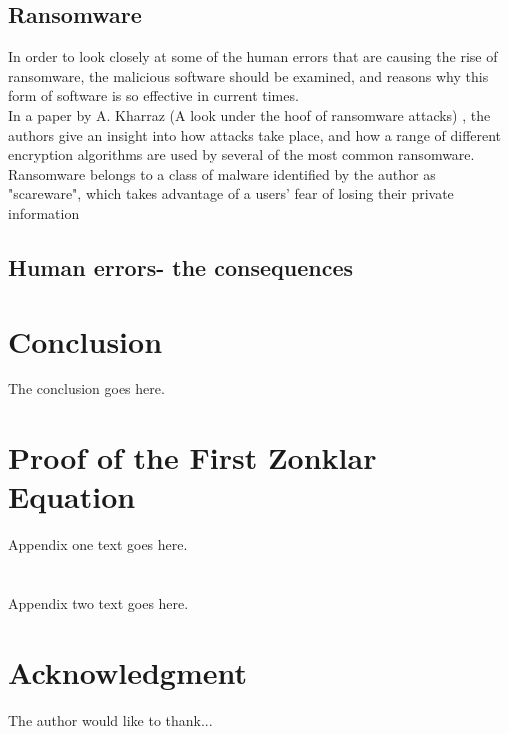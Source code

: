\documentclass[journal,comsoc]{IEEEtran}
\begin{document}
\subsection{Ransomware}
In order to look closely at some of the human errors that are causing the rise of ransomware, the malicious software should be examined, and reasons why this form of software is so effective in current times. \\
In a paper by A. Kharraz (A look under the hoof of ransomware attacks) \cite{under-the-hood}, the authors give an insight into how attacks take place, and how a range of different encryption algorithms are used by several of the most common ransomware. Ransomware belongs to a class of malware identified by the author as "scareware", which takes advantage of a users' fear of losing their private information 

\subsection{Human errors- the consequences}

\section{Conclusion}
The conclusion goes here.

\appendices
\section{Proof of the First Zonklar Equation}
Appendix one text goes here.

\section{}
Appendix two text goes here.
\section*{Acknowledgment}


The author would like to thank...

\ifCLASSOPTIONcaptionsoff
  \newpage
\fi

\end{document}

